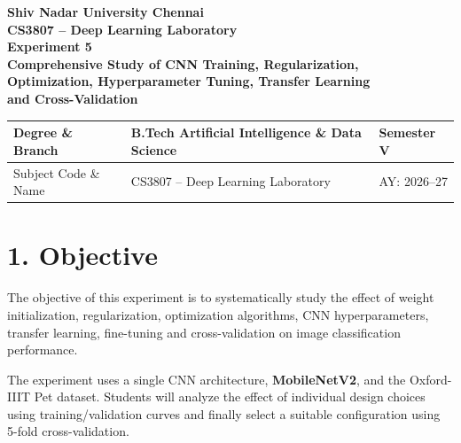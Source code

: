 \documentclass[10pt]{article}
\begin{document}
\begin{center}
{\large\textbf{Shiv Nadar University Chennai}}\\[2mm]
{\normalsize\textbf{CS3807 -- Deep Learning Laboratory}}\\[2mm]
{\large\textbf{Experiment 5}}\\[1mm]
{\normalsize\textbf{Comprehensive Study of CNN Training, Regularization,}}\\
{\normalsize\textbf{Optimization, Hyperparameter Tuning, Transfer Learning}}\\
{\normalsize\textbf{and Cross-Validation}}
\end{center}

\vspace{3mm}

\begin{tabular}{|p{3.4cm}|p{9.0cm}|p{1.4cm}|}
\hline
Degree \& Branch & B.Tech Artificial Intelligence \& Data Science & Semester V\\
\hline
Subject Code \& Name & CS3807 -- Deep Learning Laboratory & AY: 2026--27\\
\hline
\end{tabular}

\section*{1. Objective}
The objective of this experiment is to systematically study the effect of
weight initialization, regularization, optimization algorithms, CNN
hyperparameters, transfer learning, fine-tuning and cross-validation on
image classification performance.

The experiment uses a single CNN architecture, \textbf{MobileNetV2}, and
the Oxford-IIIT Pet dataset. Students will analyze the effect of
individual design choices using training/validation curves and finally
select a suitable configuration using 5-fold cross-validation.

\end{document}
